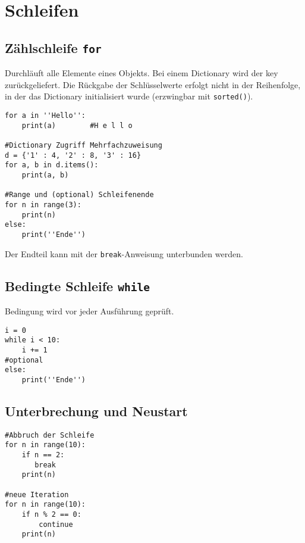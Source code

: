 \chapter{Schleifen}
\section{Zählschleife \texttt{for}}
Durchläuft alle Elemente eines Objekts. Bei einem Dictionary wird der key zurückgeliefert. Die Rückgabe der Schlüsselwerte erfolgt nicht in der Reihenfolge, in der das Dictionary initialisiert wurde (erzwingbar mit \texttt{sorted()}).
\begin{lstlisting}
for a in ''Hello'':
	print(a)		#H e l l o

#Dictionary Zugriff Mehrfachzuweisung
d = {'1' : 4, '2' : 8, '3' : 16}
for a, b in d.items():
	print(a, b)
	
#Range und (optional) Schleifenende
for n in range(3):
	print(n)
else:
	print(''Ende'')
\end{lstlisting}
Der Endteil kann mit der \texttt{break}-Anweisung unterbunden werden.
\section{Bedingte Schleife \texttt{while}}
Bedingung wird vor jeder Ausführung geprüft.
\begin{lstlisting}
i = 0
while i < 10:
	i += 1
#optional
else:
	print(''Ende'')
\end{lstlisting}
\section{Unterbrechung und Neustart}
\begin{lstlisting}
#Abbruch der Schleife
for n in range(10):
	if n == 2:
	   break
	print(n)
	
#neue Iteration
for n in range(10):
	if n % 2 == 0:
		continue
	print(n)
\end{lstlisting}